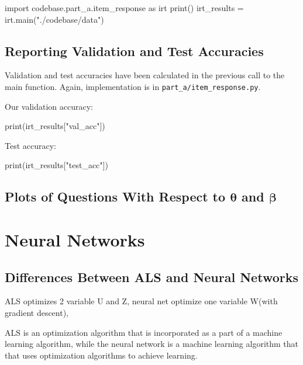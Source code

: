 \documentclass{article}
\begin{document}
    \begin{pylabblock}[IRT]
        import codebase.part_a.item_response as irt
        print()
        irt_results = irt.main("./codebase/data")
    \end{pylabblock}
    \printpythontex[verb]


    \medskip

    \subsection{Reporting Validation and Test Accuracies}

    Validation and test accuracies have been calculated in the previous call to the main function. Again, implementation is in \verb|part_a/item_response.py|.

    \medskip

    \noindent
    Our validation accuracy:
    \begin{pylabblock}[IRT]
        print(irt_results["val_acc"])
    \end{pylabblock}
    \printpythontex[verb]

    \medskip

    \noindent
    Test accuracy:
    \begin{pylabblock}[IRT]
        print(irt_results["test_acc"])
    \end{pylabblock}
    \printpythontex[verb]

    \subsection{Plots of Questions With Respect to $\bm{\theta}$ and $\bm{\beta}$}


    \pagebreak

    \section{Neural Networks}
    \subsection{Differences Between ALS and Neural Networks}
    
    ALS optimizes 2 variable U and Z, neural net optimize one variable W(with gradient descent),

    ALS is an optimization algorithm that is incorporated as a part of a machine learning algorithm, while the neural network is a machine learning algorithm that that uses optimization algorithms to achieve learning.
\end{document}
